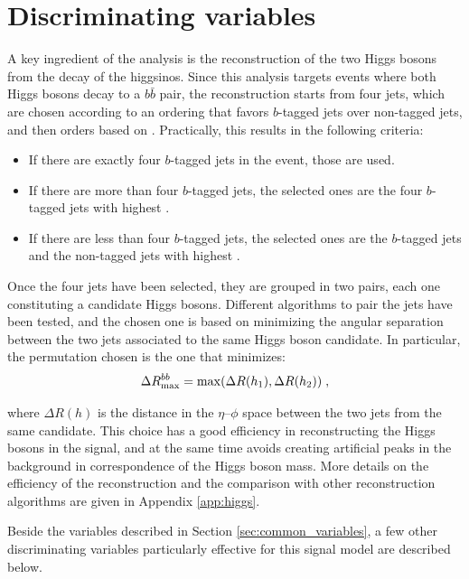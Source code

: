 \section{Discriminating variables}
\label{sec:ewk:sigbkg}

A key ingredient of the analysis is the reconstruction of the two Higgs bosons from the decay of the higgsinos.
Since this analysis targets events where both Higgs bosons decay to a $b\bar{b}$ pair, the reconstruction starts 
from four jets, which are chosen according to an ordering that favors $b$-tagged jets over non-tagged jets,
and then orders based on \pt. Practically, this results in the following criteria:
\begin{itemize}
\item If there are exactly four $b$-tagged jets in the event, those are used.
\item If there are more than four $b$-tagged jets, the selected ones are the four $b$-tagged jets with highest \pt.
\item If there are less than four $b$-tagged jets, the selected ones are the $b$-tagged jets and the non-tagged jets with highest \pt.
\end{itemize} 

Once the four jets have been selected, they are grouped in two pairs, each one constituting a candidate Higgs bosons. 
Different algorithms to pair the jets have been tested, and the chosen one is based on minimizing the angular separation 
between the two jets associated to the same Higgs boson candidate. 
In particular, the permutation chosen is the one that minimizes:
\begin{equation}
\Delta R_{\mathrm{max}}^{bb} = \mathrm{max}(\Delta R(h_1), \Delta R(h_2)) \; , \nonumber
\end{equation}

\noindent where $\Delta R(h)$ is the distance in the $\eta$--$\phi$ space between the two jets from the same candidate.
This choice has a good efficiency in reconstructing the Higgs bosons in the signal, 
and at the same time avoids creating artificial peaks in the background in correspondence of the Higgs boson mass. 
More details on the efficiency of the reconstruction and the comparison with other reconstruction algorithms are given in 
Appendix \ref{app:higgs}.

Beside the variables described in Section \ref{sec:common_variables}, a few other discriminating variables particularly 
effective for this signal model are described below.

